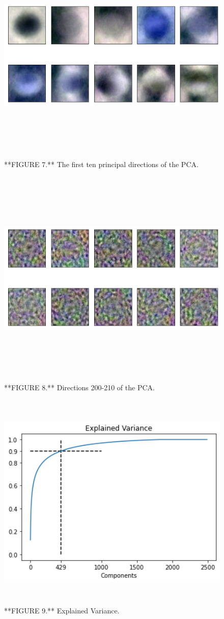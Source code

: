 \documentclass{acm_proc_article-sp}
\begin{document}
\begin{figure}

{\centering \includegraphics[width=800px,height=400]{Images/PCA1} 

}

\caption{**FIGURE 7.** The first ten principal directions of the PCA.}\label{fig:pca1}
\end{figure}
\begin{figure}

{\centering \includegraphics[width=800px,height=400]{Images/PCA200} 

}

\caption{**FIGURE 8.** Directions 200-210 of the PCA.}\label{fig:pca200}
\end{figure}
\begin{figure}

{\centering \includegraphics[width=550px,height=400]{Images/ExplainedVariance90} 

}

\caption{**FIGURE 9.** Explained Variance.}\label{fig:variance}
\end{figure}
\end{document}

